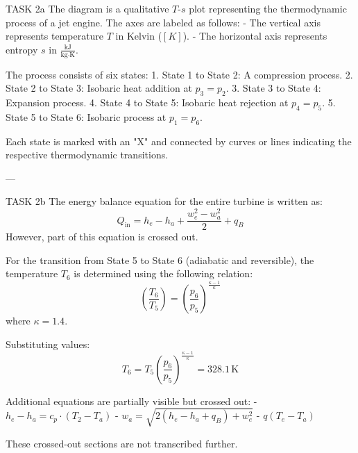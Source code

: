 TASK 2a  
The diagram is a qualitative \( T \)-\( s \) plot representing the thermodynamic process of a jet engine. The axes are labeled as follows:  
- The vertical axis represents temperature \( T \) in Kelvin (\( [K] \)).  
- The horizontal axis represents entropy \( s \) in \( \frac{\text{kJ}}{\text{kg·K}} \).  

The process consists of six states:  
1. State 1 to State 2: A compression process.  
2. State 2 to State 3: Isobaric heat addition at \( p_3 = p_2 \).  
3. State 3 to State 4: Expansion process.  
4. State 4 to State 5: Isobaric heat rejection at \( p_4 = p_5 \).  
5. State 5 to State 6: Isobaric process at \( p_1 = p_6 \).  

Each state is marked with an "X" and connected by curves or lines indicating the respective thermodynamic transitions.

---

TASK 2b  
The energy balance equation for the entire turbine is written as:  
\[
Q_{\text{in}} = h_e - h_a + \frac{w_e^2 - w_a^2}{2} + q_B
\]  
However, part of this equation is crossed out.

For the transition from State 5 to State 6 (adiabatic and reversible), the temperature \( T_6 \) is determined using the following relation:  
\[
\left( \frac{T_6}{T_5} \right) = \left( \frac{p_6}{p_5} \right)^{\frac{\kappa - 1}{\kappa}}
\]  
where \( \kappa = 1.4 \).  

Substituting values:  
\[
T_6 = T_5 \left( \frac{p_6}{p_5} \right)^{\frac{\kappa - 1}{\kappa}} = 328.1 \, \text{K}
\]  

Additional equations are partially visible but crossed out:  
- \( h_e - h_a = c_p \cdot (T_2 - T_a) \)  
- \( w_a = \sqrt{2 \left( h_e - h_a + q_B \right) + w_e^2} \)  
- \( q(T_e - T_a) \)  

These crossed-out sections are not transcribed further.